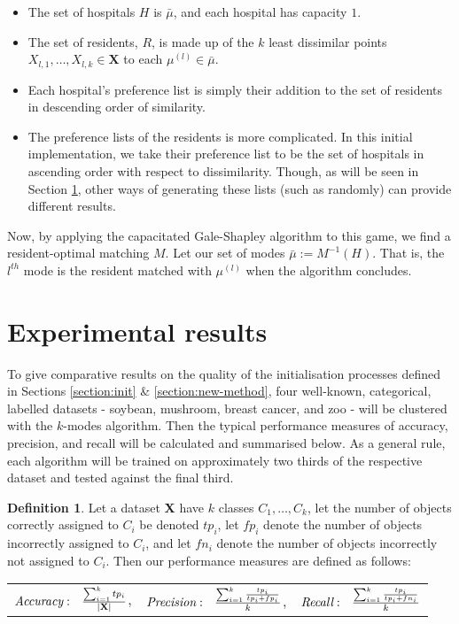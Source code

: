\documentclass{article}
\theoremstyle{definition}
\newtheorem{definition}{Definition}[section]
\begin{document}
\begin{itemize}
	\item The set of hospitals $H$ is $\bar{\mu}$, and each hospital has capacity $1$.

	\item The set of residents, $R$, is made up of the $k$ least dissimilar points $X_{l,1}, \ldots, X_{l,k} \in \textbf{X}$ to each $\mu^{(l)} \in \bar{\mu}$.

	\item Each hospital's preference list is simply their addition to the set of residents in descending order of similarity.
	
	\item The preference lists of the residents is more complicated. In this initial implementation, we take their preference list to be the set of hospitals in ascending order with respect to dissimilarity. Though, as will be seen in Section \ref{section:results}, other ways of generating these lists (such as randomly) can provide different results.
\end{itemize}

Now, by applying the capacitated Gale-Shapley algorithm to this game, we find a resident-optimal matching $M$. Let our set of modes $\bar{\mu} := M^{-1}(H)$. That is, the $l^{th}$ mode is the resident matched with $\mu^{(l)}$ when the algorithm concludes.



\section{Experimental results}\label{section:results}

To give comparative results on the quality of the initialisation processes defined in Sections \ref{section:init} \& \ref{section:new-method}, four well-known, categorical, labelled datasets - soybean, mushroom, breast cancer, and zoo - will be clustered with the $k$-modes algorithm. Then the typical performance measures of accuracy, precision, and recall will be calculated and summarised below. As a general rule, each algorithm will be trained on approximately two thirds of the respective dataset and tested against the final third.

\begin{definition}
	Let a dataset \textbf{X} have $k$ classes $C_1, \ldots, C_k$, let the number of objects correctly assigned to $C_i$ be denoted $tp_i$, let $fp_i$ denote the number of objects incorrectly assigned to $C_i$, and let $fn_i$ denote the number of objects incorrectly not assigned to $C_i$. Then our performance measures are defined as follows: \\
		
		\centering
		\begin{tabular}{ccc}
			$\emph{Accuracy}: \ \ \frac{\sum_{i=1}^{k}{tp_i}}{|\textbf{X}|}$, &
			
			$\emph{Precision}: \ \ \frac{\sum_{i=1}^{k} \frac{tp_i}{tp_i + fp_i}}{k}$, &
			
			$\emph{Recall}: \ \ \frac{\sum_{i=1}^{k} \frac{tp_i}{tp_i + fn_i}}{k}$ \\
		\end{tabular}
\end{definition}
\end{document}

